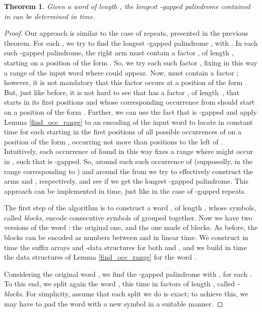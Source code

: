 \documentclass[final]{dmtcs-episciences}
\newtheorem{theorem}{Theorem}
\begin{document}
\begin{theorem}\label{algorithm_case_aperiodic}
Given a word  of length , the longest -gapped palindrome  contained in  can be determined in  time. 
\end{theorem}
\begin{proof} 
Our approach is similar to the case of repeats, presented in the previous theorem. For each , we try to find the longest -gapped palindrome , with . In each such -gapped palindrome, the right arm  must contain a factor , of length , starting on a position of the form . So, we try each such factor , fixing in this way a range of the input word where  could appear. Now,  must contain a factor ; however, it is not mandatory that this factor  occurs at a position of the form . But, just like before, it is not hard to see that  has a factor , of length~, that starts in its first  positions and whose corresponding occurrence  from  should start on a position of the form . 
Further, we can use the fact that  is -gapped and apply Lemma \ref{find_occ_range} to an encoding of the input word to locate in constant time for each  starting in the first  positions of  all possible occurrences of  on a position of the form , occurring not more than  positions to the left of . Intuitively, each occurrence of  found in this way fixes a range where  might occur in , such that  is -gapped. So, around each such occurrence of  (supposedly, in the range corresponding to ) and around the  from  we try to effectively construct the arms  and , respectively, and see if we get the longest -gapped palindrome. This approach can be implemented in  time, just like in the case of -gapped repeats.

The first step of the algorithm is to construct a word , of length , whose symbols, called {\em blocks}, encode  consecutive symbols of  grouped together. Now we have two versions of the word : the original one, and the one made of blocks. As before, the blocks can be encoded as numbers between  and  in linear time. We construct in  time the suffix arrays and -data structures for both  and , and we build in  time the data structures of Lemma \ref{find_occ_range} for the word .

Considering the original word , we find the -gapped palindrome  with , for each . To this end, we split again the word , this time in factors of length , called {\em -blocks}. For simplicity, assume that each split we do is exact; to achieve this, we may have to pad the word with a new symbol in a suitable manner. 


\end{proof}
\end{document}
